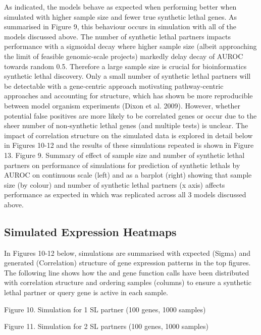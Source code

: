 As indicated, the models behave as expected when performing better when simulated with higher sample size and fewer true \gls{synthetic lethal} genes.  As summarised in Figure 9, this behaviour occurs in simulation with all of the models discussed above.  The number of \gls{synthetic lethal} partners impacts performance with a sigmoidal decay where­­ higher sample size (albeit approaching the limit of feasible \gls{genomic}-scale projects) markedly delay decay of \gls{AUROC} towards random 0.5.  Therefore a large sample size is crucial for \gls{bioinformatics} \gls{synthetic lethal} discovery.  Only a small number of \gls{synthetic lethal} partners will be detectable with a gene-centric approach motivating pathway-centric approaches and accounting for  structure, which has shown be more reproducible between model organism experiments (Dixon et al. 2009).  However, whether potential false positives are more likely to be correlated genes or occur due to the sheer number of non-synthetic lethal genes (and multiple tests) is unclear.  The impact of correlation structure on the simulated data is explored in detail below in Figures 10-12 and the results of these simulations repeated is shown in Figure 13.    Figure 9.  Summary of effect of sample size and number of \gls{synthetic lethal} partners on performance of simulations for prediction of \glspl{synthetic lethal} by \gls{AUROC} on continuous scale (left) and as a barplot (right) showing that sample size (by colour) and number of \gls{synthetic lethal} partners (x axis) affects performance as expected in which was replicated across all 3 models discussed above.

\subsection{Simulated Expression Heatmaps}

In Figures 10-12 below, simulations are summarised with expected (Sigma) and generated (Correlation) structure of \gls{gene expression} patterns in the top figures.  The following line shows how the  and gene function calls have been distributed with correlation structure and ordering samples (columns) to ensure a \gls{synthetic lethal} partner or query gene is active in each sample.

Figure 10.  Simulation for 1 SL partner (100 genes, 1000 samples)

Figure 11.  Simulation for 2 SL partners (100 genes, 1000 samples)

